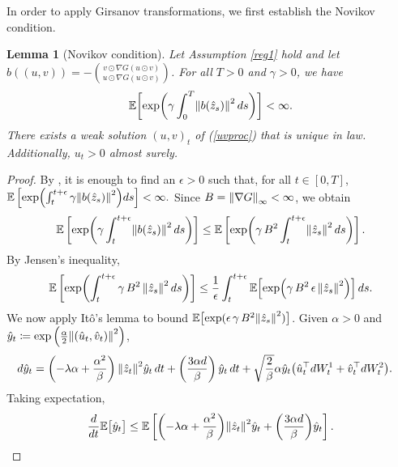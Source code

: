 \documentclass[11pt, twoside]{report}
\newtheorem{lemma}[theorem]{Lemma}
\begin{document}
 In order to apply  Girsanov transformations, we first establish the Novikov condition.
\begin{lemma}[Novikov condition]\label{lem:novikov}
    Let Assumption \ref{reg1} hold and let $b((u,v)) = -\binom{v\odot \nabla G(u\odot v)}{u\odot \nabla G(u\odot v)}$. For all $T>0$ and $\gamma>0$, we have
    $$
    \EE\biggl[ \exp\biggl(\gamma \int_0^T \norm{b(\hat{z}_s)}^2 \,ds\biggr) \biggr] <\infty.
    $$
    There exists a weak solution $(u,v)_t$ of (\ref{uvproc}) that is unique in law. Additionally, $u_t>0$ almost surely.
\end{lemma}
\begin{proof}

By \cite[Corollary 5.14]{Karatzas1991-xr}, it is enough to find an $\epsilon>0$ such that, for all $t\in [0,T]$, 
$
\EE\left[ \exp\pa{\int_t^{t+\epsilon}  \gamma \norm{b(\hat{z}_s)}^2} ds \right] <\infty.
$
Since $B = \left\lVert\nabla G\right\rVert_\infty<\infty$, we obtain
\begin{align*}
    \EE\left[ \exp\pa{\gamma \int_t^{t+\epsilon} \norm{b(\hat{z}_s)}^2 \,ds} \right] \leq  \EE\left[\exp\pa{ \gamma \,\cinfty^2\int_t^{t+\epsilon} \norm{\hat{z}_s}^2 \,ds }\right].
\end{align*}
By Jensen's inequality,
\begin{equation}\label{eq:novikov}
    \EE\left[\exp\pa{ \int_t^{t+\epsilon} \gamma\, \cinfty^2\, \norm{\hat{z}_s}^2 \,ds} \right] \leq  \frac{1}{\epsilon}  \int_t^{t+\epsilon} \EE\Bigl[ \exp\pa{\gamma\, \cinfty^2\, \epsilon\,  \norm{\hat{z}_s}^2 } \Bigr] \,ds.
\end{equation}
We now apply It\^o's lemma to bound $\EE \bigl[ \exp(\epsilon\, \gamma\, \cinfty^2 \norm{\hat{z}_s}^2 ) \bigr]$. 
Given  $\alpha>0$ and  $\hat{y}_t \eqdef\exp\left(\frac{\alpha}{2}\norm{(\hat{u}_t,\hat{v}_t)}^2 \right)$,
\begin{align*}
    d\hat y_t &= \pa{-\lambda \alpha  + \frac{\alpha^2}{\beta}} \,\norm{\hat z_t}^2\hat y_t\, dt + \pa{\frac{3\alpha d}{\beta}}\, \hat y_t\, dt + \sqrt{\frac{2}{\beta}} \alpha \hat y_t  \pa{\hat u_t^\top d W^1_t + \hat v_t^\top d W^2_t}.
\end{align*}
Taking expectation,
$$
\frac{d}{dt}\EE\bigl[\hat y_t\bigr] \leq \EE\left[\pa{-\lambda \alpha + \frac{\alpha^2}{\beta}}\norm{\hat z_t}^2 \hat y_t + \pa{\frac{3\alpha d}{\beta}} \hat y_t\right].
$$


\end{proof}
\end{document}
